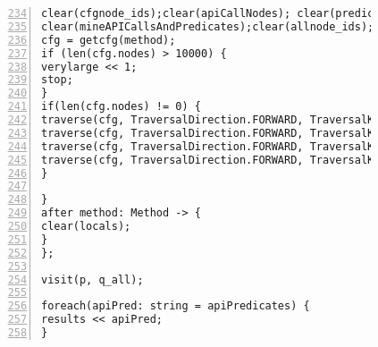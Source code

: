 \begin{figure}[ht!]
\begin{lstlisting}[numbers=left, tabsize=4, escapechar=@, caption={API Precondition Mining Analysis},label={lst:apm-code}, firstline = 234, firstnumber = 234, lastline = 295]
clear(cfgnode_ids);clear(apiCallNodes); clear(predicateExprsAtNodes);
clear(mineAPICallsAndPredicates);clear(allnode_ids);clear(cfg_dom); clear(dom_result);
cfg = getcfg(method);
if (len(cfg.nodes) > 10000) {
verylarge << 1;
stop;
}
if(len(cfg.nodes) != 0) {
traverse(cfg, TraversalDirection.FORWARD, TraversalKind.HYBRID, mineAPICallsAndPredicates);
traverse(cfg, TraversalDirection.FORWARD, TraversalKind.HYBRID, allnode_ids);
traverse(cfg, TraversalDirection.FORWARD, TraversalKind.HYBRID, cfg_dom, fixp1);
traverse(cfg, TraversalDirection.FORWARD, TraversalKind.HYBRID, dom_result);
}

}
after method: Method -> {
clear(locals);    
}
};

visit(p, q_all);

foreach(apiPred: string = apiPredicates) {
results << apiPred;                
}
\end{lstlisting}
\end{figure}